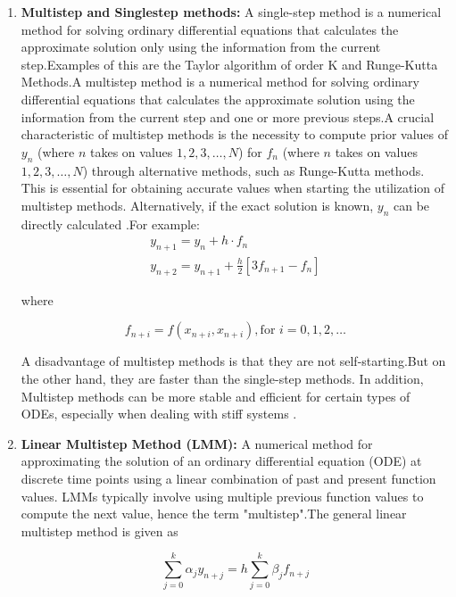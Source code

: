 \documentclass[a4paper, twoside]{report} %
\begin{document}
\begin{enumerate}
		\item \textbf{Multistep and Singlestep methods:} A single-step method is a numerical method for solving ordinary differential equations that calculates the approximate solution only using the information from the current step.Examples of this are the Taylor algorithm of order K and Runge-Kutta Methods.A multistep method is a numerical method for solving ordinary differential equations that calculates the approximate solution using the information from the current step and one or more previous steps.A crucial characteristic of multistep methods is the necessity to compute prior values of \(y_n\) (where \(n\) takes on values \(1, 2, 3, \ldots, N\)) for \(f_n\) (where \(n\) takes on values \(1, 2, 3, \ldots, N\)) through alternative methods, such as Runge-Kutta methods. This is essential for obtaining accurate values when starting the utilization of multistep methods. Alternatively, if the exact solution is known, \(y_n\) can be directly calculated \cite{powerseriesJFatokun}.For example:
		\begin{eqnarray}
			y_{n+1} = y_n + h \cdot f_n \\
			y_{n+2} = y_{n+1} + \frac{h}{2} \left[ 3f_{n+1} - f_n \right]
		\end{eqnarray}

		where

		\begin{equation}
			f_{n+i} = f(x_{n+i},x_{n+i}), \text{for } i = 0,1,2,\dots
		\end{equation}


		A disadvantage of multistep methods is that they are not self-starting.But on the other hand, they are faster than the single-step methods. In addition, Multistep methods can be more stable and efficient for certain types of ODEs, especially when dealing with stiff systems \cite{powerseriesJFatokun}.

		\item \textbf{Linear Multistep Method (LMM):} A numerical method for approximating the solution of an ordinary differential equation (ODE) at discrete time points using a linear combination of past and present function values. LMMs typically involve using multiple previous function values to compute the next value, hence the term "multistep".The general linear multistep method is given as

		\begin{equation}\label{eq:linear_multistep}
			\sum_{j=0}^{k} \alpha_j y_{n+j} = h \sum_{j=0}^{k} \beta_j f_{n+j}
		\end{equation}


\end{enumerate}
\end{document}

